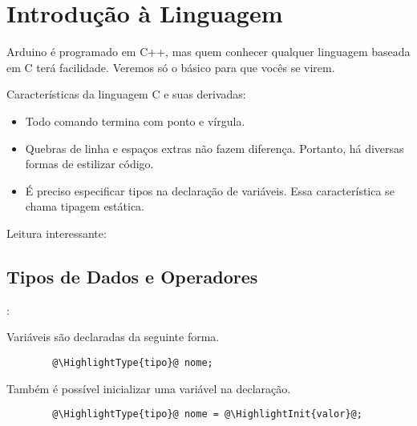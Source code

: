 
\section{Introdução à Linguagem}


\begin{frame}[b]{\insertsection}

	Arduino é programado em C++, mas quem conhecer qualquer linguagem baseada em C terá facilidade. Veremos só o básico para que vocês se virem.

	\bigskip
	Características da linguagem C e suas derivadas:
	\begin{itemize}
		\item Todo comando termina com ponto e vírgula.
		\item Quebras de linha e espaços extras não fazem diferença. Portanto, há diversas formas de estilizar código.
		\item É preciso especificar tipos na declaração de variáveis. Essa característica se chama tipagem estática.
	\end{itemize}

	\vfill
	Leitura interessante: 

\end{frame}


\subsection{Tipos de Dados e Operadores}


\begin{frame}[fragile]{\insertsection: \insertsubsection}

	Variáveis são declaradas da seguinte forma.
	\begin{verbatim}
		@\HighlightType{tipo}@ nome;
	\end{verbatim}

	Também é possível inicializar uma variável na declaração.
	\begin{verbatim}
		@\HighlightType{tipo}@ nome = @\HighlightInit{valor}@;
	\end{verbatim}

\end{frame}


